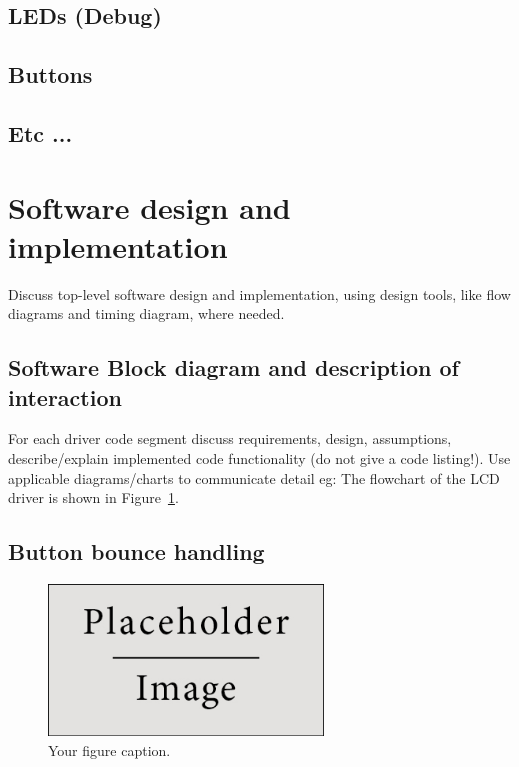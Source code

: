 \documentclass[11pt,a4paper]{article}
\begin{document}
	\subsection{LEDs (Debug)}
	
	\subsection{Buttons}
	\subsection{Etc ...}
	
	\section{Software design and implementation}
	Discuss top-level software design and implementation, using design tools, like flow diagrams and timing diagram, where needed. 
	
	\subsection{Software Block diagram and description of interaction}
	For each driver code segment discuss requirements, design, assumptions, describe/explain implemented code functionality (do not give a code listing!). Use applicable diagrams/charts to communicate detail eg: The flowchart of the LCD driver is shown in Figure~\ref{fig:place}.
	
	\subsection{Button bounce handling}
	
	\begin{figure}[ht]
		\begin{center}
			\includegraphics[width=0.65\textwidth]{placeholder} %
			\caption{Your figure caption.}
			\label{fig:place}
		\end{center}
	\end{figure}
\end{document}
